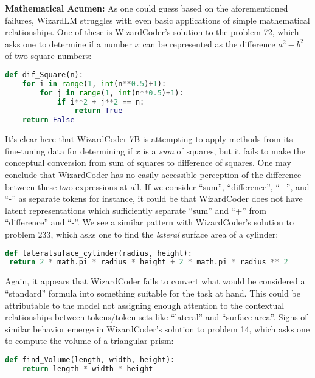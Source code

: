 \documentclass[10pt]{article}
\theoremstyle{definition}
\begin{document}
\noindent\textbf{Mathematical Acumen:} As one could guess based on the aforementioned failures, WizardLM struggles with even basic applications of simple mathematical relationships. One of these is WizardCoder's solution to the problem 72, which asks one to determine if a number $x$ can be represented as the difference $a^2 - b^2$ of two square numbers:
\begin{lstlisting}[language=Python]
def dif_Square(n):
    for i in range(1, int(n**0.5)+1):
        for j in range(1, int(n**0.5)+1):
            if i**2 + j**2 == n:
                return True
    return False
\end{lstlisting}
\noindent It's clear here that WizardCoder-7B is attempting to apply methods from its fine-tuning data for determining if $x$ is a \textit{sum} of squares, but it fails to make the conceptual conversion from sum of squares to difference of squares. One may conclude that WizardCoder has no easily accessible perception of the difference between these two expressions at all. If we consider ``sum'', ``difference'', ``+'', and ``-'' as separate tokens for instance, it could be that WizardCoder does not have latent representations which sufficiently separate ``sum'' and ``+'' from ``difference'' and ``-''. We see a similar pattern with WizardCoder's solution to problem 233, which asks one to find the \textit{lateral} surface area of a cylinder:
\begin{lstlisting}[language=Python]
def lateralsuface_cylinder(radius, height):
 return 2 * math.pi * radius * height + 2 * math.pi * radius ** 2
\end{lstlisting}
\noindent Again, it appears that WizardCoder fails to convert what would be considered a ``standard'' formula into something suitable for the task at hand. This could be attributable to the model not assigning enough attention to the contextual relationships between tokens/token sets like ``lateral'' and ``surface area''. Signs of similar behavior emerge in WizardCoder's solution to problem 14, which asks one to compute the volume of a triangular prism:
\begin{lstlisting}[language=Python]
def find_Volume(length, width, height):
    return length * width * height
\end{lstlisting}
\end{document}
